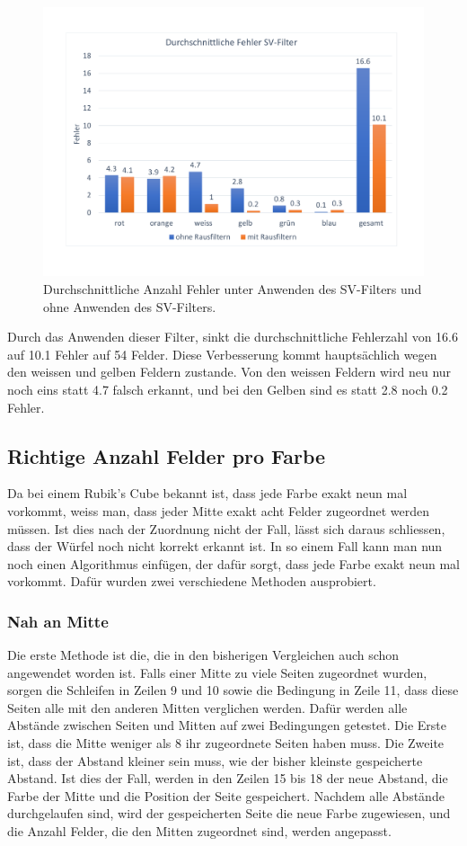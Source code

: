 \documentclass[a4paper, 12pt]{article}
\begin{document}
\begin{figure}[H]
\includegraphics[scale=0.4]{Fehler_SV_Filter} 
\caption{Durchschnittliche Anzahl Fehler unter Anwenden des SV-Filters und ohne Anwenden des SV-Filters.}
\end{figure}
Durch das Anwenden dieser Filter, sinkt die durchschnittliche Fehlerzahl von 16.6 auf 10.1 Fehler auf 54 Felder. Diese Verbesserung kommt hauptsächlich wegen den weissen und gelben Feldern zustande. Von den weissen Feldern wird neu nur noch eins statt 4.7 falsch erkannt, und bei den Gelben sind es statt 2.8 noch 0.2 Fehler.
\subsection{Richtige Anzahl Felder pro Farbe}
Da bei einem Rubik's Cube bekannt ist, dass jede Farbe exakt neun mal vorkommt, weiss man, dass jeder Mitte exakt acht Felder zugeordnet werden müssen. Ist dies nach der Zuordnung nicht der Fall, lässt sich daraus schliessen, dass der Würfel noch nicht korrekt erkannt ist. In so einem Fall kann man nun noch einen Algorithmus einfügen, der dafür sorgt, dass jede Farbe exakt neun mal vorkommt. Dafür wurden zwei verschiedene Methoden ausprobiert.
\subsubsection{Nah an Mitte}
Die erste Methode ist die, die in den bisherigen Vergleichen auch schon angewendet worden ist. Falls einer Mitte zu viele Seiten zugeordnet wurden, sorgen die Schleifen in Zeilen 9 und 10 sowie die Bedingung in Zeile 11, dass diese Seiten alle mit den anderen Mitten verglichen werden. Dafür werden alle Abstände zwischen Seiten und Mitten auf zwei Bedingungen getestet. Die Erste ist, dass die Mitte weniger als 8 ihr zugeordnete Seiten haben muss. Die Zweite ist, dass der Abstand kleiner sein muss, wie der bisher kleinste gespeicherte Abstand. Ist dies der Fall, werden in den Zeilen 15 bis 18 der neue Abstand, die Farbe der Mitte und die Position der Seite gespeichert. Nachdem alle Abstände durchgelaufen sind, wird der gespeicherten Seite die neue Farbe zugewiesen, und die Anzahl Felder, die den Mitten zugeordnet sind, werden angepasst.

\end{document}
